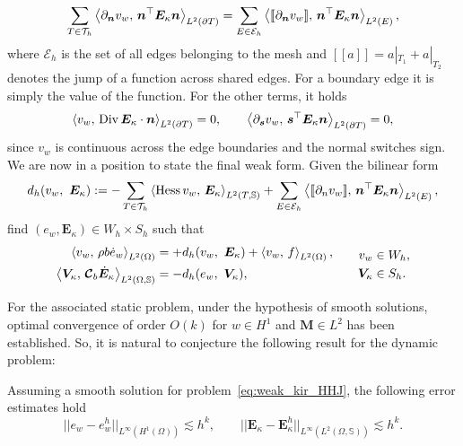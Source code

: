 \begin{equation*}
\sum_{T \in \mathcal{T}_h} \inner[L^2(\partial T)]{\partial_{\bm{n}} v_w}{\bm{n}^\top\bm{E}_\kappa \bm{n}} = \sum_{E \in \mathcal{E}_h} \inner[L^2(E)]{[\![\partial_{\bm{n}} v_w]\!]}{\bm{n}^\top\bm{E}_\kappa \bm{n}},
\end{equation*} 
where $\mathcal{E}_h$ is the set of all edges belonging to the mesh and $[\![a]\!] = a|_{T_1} + a|_{T_2}$ denotes the jump of a function across shared edges. For a boundary edge it is simply the value of the function. For the other terms, it holds 
\[
\inner[L^2(\partial T)]{v_w}{\Div \bm{E}_\kappa \cdot \bm{n}} = 0, \qquad \inner[L^2(\partial T)]{\partial_{\bm{s}} v_w}{\bm{s}^\top\bm{E}_\kappa \bm{n}} = 0,
\]
since $v_w$ is continuous across the edge boundaries and the normal switches sign. We are now in a position to state the final weak form. Given the bilinear form
\[
d_h(v_w, \ \bm{E}_{\kappa}) := - \sum_{T \in \mathcal{T}_h} \inner[L^2(T, \mathbb{S})]{\Hess v_w}{\bm{E}_\kappa} + \sum_{E \in \mathcal{E}_h} \inner[L^2(E)]{[\![\partial_n v_w]\!]}{\bm{n}^\top\bm{E}_\kappa \bm{n}}, 
\]
find $(e_w, \bm{E}_\kappa) \in W_h \times S_h$ such that
\begin{equation}
\label{eq:weak_kir_HHJ}
\begin{aligned}
\inner[L^2(\Omega)]{v_w}{\rho b \dot{e}_w} &= +d_h(v_w, \ \bm{E}_{\kappa}) + \inner[L^2(\Omega)]{v_w}{f}, \\ 
\inner[L^2(\Omega, \mathbb{S})]{\bm{V}_\kappa}{\bm{\mathcal{C}}_b \dot{\bm{E}}_\kappa} &= -d_h(e_w, \ \bm{V}_{\kappa}), \\ 
\end{aligned} \qquad
\begin{aligned}
v_w &\in W_h, \\
\bm{V}_\kappa &\in S_h. \\
\end{aligned}
\end{equation}

For the associated static problem, under the hypothesis of smooth solutions, optimal convergence of order $O(k)$ for $w \in H^1$ and $\bm{M} \in L^2$ has been established. So, it is natural to conjecture the following result for the dynamic problem:
\begin{conjecture}
	\label{conj:HHJestimates}
	Assuming a smooth solution for problem~\eqref{eq:weak_kir_HHJ}, the following error estimates hold
	\begin{equation}
	\label{eq:errHHJ}
	||e_w - e_w^h||_{L^{\infty} (H^1(\Omega))} \lesssim h^{k}, \qquad
	||\bm{E}_\kappa - \bm{E}_\kappa^h||_{L^{\infty} (L^2(\Omega, \mathbb{S}))} \lesssim h^{k}.
	\end{equation}
\end{conjecture}



